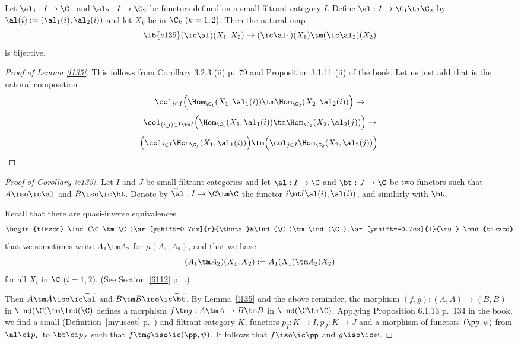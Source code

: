 \documentclass[12pt]{article}
\theoremstyle{remark}
\theoremstyle{definition}
\begin{document}
\begin{lem}
Let $\al_1:I\to\C_1$ and $\al_2:I\to\C_2$ be functors defined on a small filtrant category $I$. Define $\al:I\to\C_1\tm\C_2$ by $\al(i):=(\al_1(i),\al_2(i))$ and let $X_k$ be in $\C_k\ (k=1,2)$. Then the natural map 
\begin{equation}\lb{e135}
(\ic\al)(X_1,X_2)\to(\ic\al_1)(X_1)\tm(\ic\al_2)(X_2)
\end{equation}
is bijective.
\end{lem}

\begin{proof}[Proof of Lemma \ref{l135}] 
This follows from Corollary 3.2.3 (ii) p.~79 and Proposition 3.1.11 (ii) of the book. Let us just add that  is the natural composition 
$$
\col_{i\in I}\Big(\Hom_{\C_1}(X_1,\al_1(i))\tm\Hom_{\C_2}(X_2,\al_2(i))\Big)\to
$$ 
$$
\col_{(i,j)\in I\tm I}\Big(\Hom_{\C_1}(X_1,\al_1(i))\tm\Hom_{\C_2}(X_2,\al_2(j))\Big)\to
$$
$$
\Big(\col_{i\in I}\Hom_{\C_1}(X_1,\al_1(i))\Big)\tm\Big(\col_{j\in I}\Hom_{\C_2}(X_2,\al_2(j))\Big).
$$ 
\end{proof}

\begin{proof}[Proof of Corollary \ref{c135}] 
Let $I$ and $J$ be small filtrant categories and let $\al:I\to\C$ and $\bt:J\to\C$ be two functors such that $A\iso\ic\al$ and $B\iso\ic\bt$. Denote by $\widetilde\al:I\to\C\tm\C$ the functor $i\mt(\al(i),\al(i))$, and similarly with $\bt$. 

Recall that there are quasi-inverse equivalences
$$
\begin{tikzcd}
\Ind(\C\tm\C)\ar[yshift=0.7ex]{r}{\theta}&\Ind(\C)\tm\Ind(\C),\ar[yshift=-0.7ex]{l}{\mu}
\end{tikzcd}
$$ 
that we sometimes write $A_1\tm A_2$ for $\mu(A_1,A_2)$, and that we have  
$$
(A_1\tm A_2)(X_1,X_2):=A_1(X_1)\tm A_2(X_2)
$$ 
for all $X_i$ in $\C$ ($i=1,2$). (See Section~\ref{6112} p.~.)

Then $A\tm A\iso\ic\widetilde\al$ and $B\tm B\iso\ic\widetilde\bt$. By Lemma~\ref{l135} and the above reminder, the morphism $(f,g):(A,A)\to(B,B)$ in $\Ind(\C)\tm\Ind(\C)$ defines a morphism $f\tm g:A\tm A\to B\tm B$ in $\Ind(\C\tm\C)$. Applying Proposition 6.1.13 p.~134 in the book, we find a small (Definition~\ref{myuscat} p.~) and filtrant category $K$, functors $p_I:K\to I,p_J:K\to J$ and a morphism of functors $(\pp,\psi)$ from $\al\ci p_I$ to $\bt\ci p_J$ such that $f\tm g\iso\ic(\pp,\psi)$. It follows that $f\iso\ic\pp$ and $g\iso\ic\psi$.
\end{proof}
\end{document}

